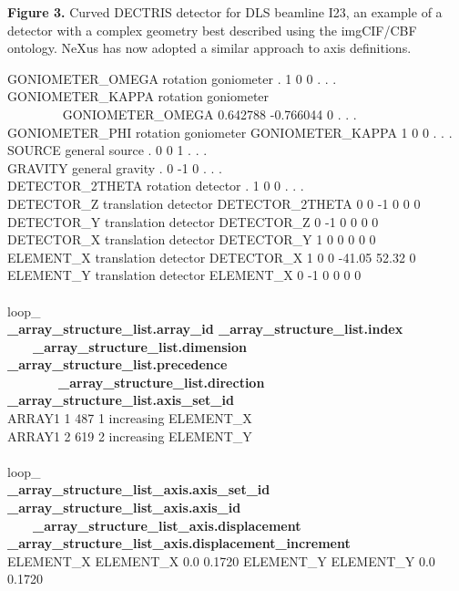 \documentclass[11pt]{a0poster}
\begin{document}
\begin{minipage}[]{0.29\linewidth}
\begin{minipage}[]{0.475\linewidth}
\fontsize{16}{20}\selectfont %
{\bf Figure 3.} Curved DECTRIS detector
for DLS beamline I23, an example of a detector with a complex geometry 
best described using the imgCIF/CBF ontology.  NeXus has now adopted a
similar approach to axis definitions.
\end{minipage}
 GONIOMETER\_OMEGA rotation goniometer . 1 0 0 . . .\\
 GONIOMETER\_KAPPA rotation goniometer \\
 \-\ ~~~~~~~  GONIOMETER\_OMEGA 0.642788 -0.766044 0 . . .\\
 GONIOMETER\_PHI rotation goniometer GONIOMETER\_KAPPA 1 0 0 . . .\\
 SOURCE general source . 0 0 1 . . .\\
 GRAVITY general gravity . 0 -1 0 . . .\\
 DETECTOR\_2THETA rotation detector . 1 0 0 . . .\\
 DETECTOR\_Z translation detector DETECTOR\_2THETA 0 0 -1 0 0 0\\
 DETECTOR\_Y translation detector DETECTOR\_Z 0 -1 0 0 0 0\\
 DETECTOR\_X translation detector DETECTOR\_Y 1 0 0 0 0 0\\
 ELEMENT\_X translation detector DETECTOR\_X 1 0 0 -41.05 52.32 0\\
 ELEMENT\_Y translation detector ELEMENT\_X 0 -1 0 0 0 0\\
\\
loop\_\\
{\bf \_array\_structure\_list.array\_id  \_array\_structure\_list.index}\\
\-\ ~~~{\bf \_array\_structure\_list.dimension  \_array\_structure\_list.precedence}\\
\-\ ~~~~~~~{\bf \_array\_structure\_list.direction  \_array\_structure\_list.axis\_set\_id}\\
 ARRAY1 1 487 1 increasing ELEMENT\_X\\
 ARRAY1 2 619 2 increasing ELEMENT\_Y\\
\\
loop\_\\
{\bf \_array\_structure\_list\_axis.axis\_set\_id  \_array\_structure\_list\_axis.axis\_id}\\
\-\ ~~~{\bf \_array\_structure\_list\_axis.displacement  \_array\_structure\_list\_axis.displacement\_increment}\\
 ELEMENT\_X ELEMENT\_X 0.0 0.1720    ELEMENT\_Y ELEMENT\_Y 0.0 0.1720\\
\\

\end{minipage}
\end{document}
